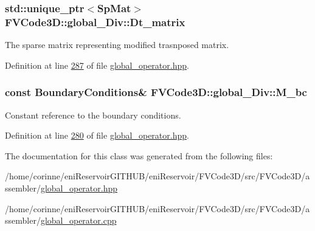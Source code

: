 \subsubsection[{\texorpdfstring{Dt\+\_\+matrix}{Dt_matrix}}]{\setlength{\rightskip}{0pt plus 5cm}std\+::unique\+\_\+ptr$<${\bf Sp\+Mat}$>$ F\+V\+Code3\+D\+::global\+\_\+\+Div\+::\+Dt\+\_\+matrix\hspace{0.3cm}{\ttfamily [private]}}\hypertarget{classFVCode3D_1_1global__Div_ad3f5341b930c36bcf243075f7f3e7414}{}\label{classFVCode3D_1_1global__Div_ad3f5341b930c36bcf243075f7f3e7414}


The sparse matrix representing modified trasnposed matrix. 



Definition at line \hyperlink{global__operator_8hpp_source_l00287}{287} of file \hyperlink{global__operator_8hpp_source}{global\+\_\+operator.\+hpp}.

\subsubsection[{\texorpdfstring{M\+\_\+bc}{M_bc}}]{\setlength{\rightskip}{0pt plus 5cm}const {\bf Boundary\+Conditions}\& F\+V\+Code3\+D\+::global\+\_\+\+Div\+::\+M\+\_\+bc\hspace{0.3cm}{\ttfamily [private]}}\hypertarget{classFVCode3D_1_1global__Div_acdcdafa941eca3b26582f33b71ff3ff3}{}\label{classFVCode3D_1_1global__Div_acdcdafa941eca3b26582f33b71ff3ff3}


Constant reference to the boundary conditions. 



Definition at line \hyperlink{global__operator_8hpp_source_l00280}{280} of file \hyperlink{global__operator_8hpp_source}{global\+\_\+operator.\+hpp}.



The documentation for this class was generated from the following files\+:\begin{DoxyCompactItemize}
\item 
/home/corinne/eni\+Reservoir\+G\+I\+T\+H\+U\+B/eni\+Reservoir/\+F\+V\+Code3\+D/src/\+F\+V\+Code3\+D/assembler/\hyperlink{global__operator_8hpp}{global\+\_\+operator.\+hpp}\item 
/home/corinne/eni\+Reservoir\+G\+I\+T\+H\+U\+B/eni\+Reservoir/\+F\+V\+Code3\+D/src/\+F\+V\+Code3\+D/assembler/\hyperlink{global__operator_8cpp}{global\+\_\+operator.\+cpp}\end{DoxyCompactItemize}
